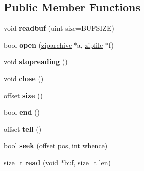 \subsection*{Public Member Functions}
\begin{DoxyCompactItemize}
\item 
\mbox{\label{structzipstream_a40235f676bf2b82cca03cdd362bb1371}} 
void {\bfseries readbuf} (uint size=B\+U\+F\+S\+I\+ZE)
\item 
\mbox{\label{structzipstream_a798fcdb22e051b5108576521163924a4}} 
bool {\bfseries open} (\hyperlink{structziparchive}{ziparchive} $\ast$a, \hyperlink{structzipfile}{zipfile} $\ast$f)
\item 
\mbox{\label{structzipstream_ab5315993e94c2d6a23b4ba32cd0856bf}} 
void {\bfseries stopreading} ()
\item 
\mbox{\label{structzipstream_a4c07eea7d22436fe5df392eaecf621f9}} 
void {\bfseries close} ()
\item 
\mbox{\label{structzipstream_a639acd3860daec1b9d4ef1ebcc94c9cc}} 
offset {\bfseries size} ()
\item 
\mbox{\label{structzipstream_a0c6a1f0a8cfba63f9bfbe5dc845f8b18}} 
bool {\bfseries end} ()
\item 
\mbox{\label{structzipstream_a15d382b56df228f14fa73639f3764463}} 
offset {\bfseries tell} ()
\item 
\mbox{\label{structzipstream_a0907e4346b6034118ef708c970c40356}} 
bool {\bfseries seek} (offset pos, int whence)
\item 
\mbox{\label{structzipstream_ad89565e867d15329dbc1bb6e2dea15d2}} 
size\+\_\+t {\bfseries read} (void $\ast$buf, size\+\_\+t len)
\end{DoxyCompactItemize}
